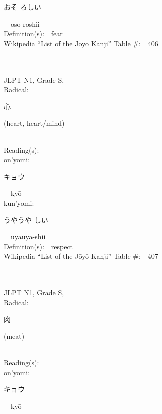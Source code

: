 \begin{multicols}{2}
{\hspace*{2em}}{\begin{CJK}{UTF8}{min} おそ-ろしい \end{CJK}}\ \ oso-roshii\ \ \\
Definition(s):\ \ fear \\
Wikipedia ``List of the J\=oy\=o Kanji'' Table \#:\ \ 406 \\
\ \ \\
{\fontsize{34pt}{40pt}  }\ \ \\
{JLPT N1, Grade S, \\Radical:\ \ {\begin{CJK}{UTF8}{min} 心 \end{CJK}} (heart, heart/mind) } \\
Reading(s):\ \ \\
{\hspace*{1em}}on'yomi:\ \ \\
{\hspace*{2em}}{\begin{CJK}{UTF8}{min} キョウ \end{CJK}}\ \ ky\=o\ \ \\
{\hspace*{1em}}kun'yomi:\ \ \\
{\hspace*{2em}}{\begin{CJK}{UTF8}{min} うやうや-しい \end{CJK}}\ \ uyauya-shii\ \ \\
Definition(s):\ \ respect \\
Wikipedia ``List of the J\=oy\=o Kanji'' Table \#:\ \ 407 \\
\ \ \\
{\fontsize{34pt}{40pt}  }\ \ \\
{JLPT N1, Grade S, \\Radical:\ \ {\begin{CJK}{UTF8}{min} 肉 \end{CJK}} (meat) } \\
Reading(s):\ \ \\
{\hspace*{1em}}on'yomi:\ \ \\
{\hspace*{2em}}{\begin{CJK}{UTF8}{min} キョウ \end{CJK}}\ \ ky\=o\ \ \\

\end{multicols}
